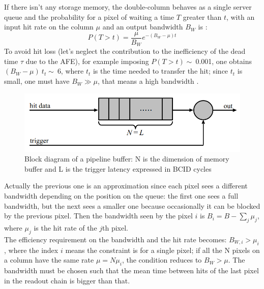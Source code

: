    If there isn't any storage memory, the double-column behaves as a single server queue and the probability for a pixel of waiting a time $T$ greater than $t$, with an input hit rate on the column $\mu$ and an output bandwidth $B_W$ is \cite{Garcia-Review}:
   \begin{equation}
   P(T > t) = \frac{\mu}{B_W} e^{-( B_W-\mu )t}
   \label{eq:priority_chain_no_buffer}
   \end{equation}
   To avoid hit loss (let's neglect the contribution to the inefficiency of the dead time $\tau$ due to the AFE), for example imposing $P(T > t)\sim\:$0.001, one obtains $(B_W -\mu)\:t_t\sim\:$6, where $t_t$ is the time needed to transfer the hit; since $t_t$ is small, one must have $B_W \gg \mu$, that means a high bandwidth \cite{Garcia-Review}.
   \begin{figure}[h!]
      \centering
      \includegraphics[width=.6\linewidth]{figures/Pixel_detectors/pipeline.png}
      \caption{Block diagram of a pipeline buffer: N is the dimension of memory buffer and L is the trigger latency expressed in BCID cycles}
      \label{fig:pipeline}
   \end{figure}

   Actually the previous one is an approximation since each pixel sees a different bandwidth depending on the position on the queue: the first one sees a full bandwidth, but the next sees a smaller one because occasionally it can be blocked by the previous pixel. Then the bandwidth seen by the pixel $i$ is $B_{i} = B - \sum _{j}\mu_{j}$, where $\mu_j$ is the hit rate of the $j$th pixel.\\
   The efficiency requirement on the bandwidth and the hit rate becomes: $B_{W,i} > \mu_{i}$, where the index $i$ means the constraint is for a single pixel; if all the N pixels on a column have the same rate $\mu = N\mu_{i}$, the condition reduces to $B_{W} > \mu$.
   The bandwidth must be chosen such that the mean time between hits of the last pixel in the readout chain is bigger than that.\\

